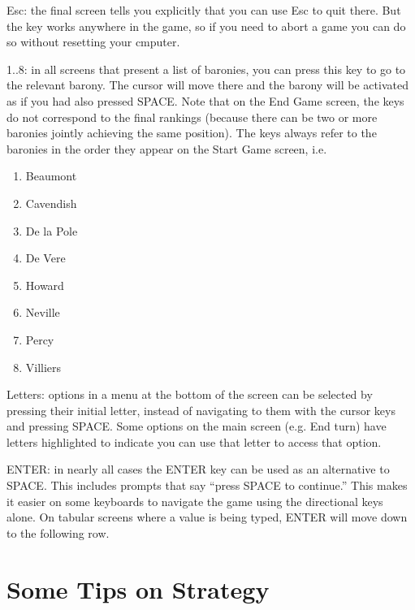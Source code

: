 \documentclass[8pt]{extarticle}
\begin{document}
Esc: the final screen tells you explicitly that you can use Esc to quit there. But the key works anywhere in the game, so if you need to abort a game you can do so without resetting your cmputer.

1..8: in all screens that present a list of baronies, you can press this key to go to the relevant barony. The cursor will move there and the barony will be activated as if you had also pressed SPACE. Note that on the End Game screen, the keys do not correspond to the final rankings (because there can be two or more baronies jointly achieving the same position). The keys always refer to the baronies in the order they appear on the Start Game screen, i.e.

\begin{enumerate}
\item Beaumont
\item Cavendish
\item De la Pole
\item De Vere
\item Howard
\item Neville
\item Percy
\item Villiers
\end{enumerate}

Letters: options in a menu at the bottom of the screen can be selected by pressing their initial letter, instead of navigating to them with the cursor keys and pressing SPACE. Some options on the main screen (e.g. End turn) have letters highlighted to indicate you can use that letter to access that option.

ENTER: in nearly all cases the ENTER key can be used as an alternative to SPACE. This includes prompts that say ``press SPACE to continue.'' This makes it easier on some keyboards to navigate the game using the directional keys alone. On tabular screens where a value is being typed, ENTER will move down to the following row.

%
%

\pagebreak %
\section*{Some Tips on Strategy}
\end{document}
